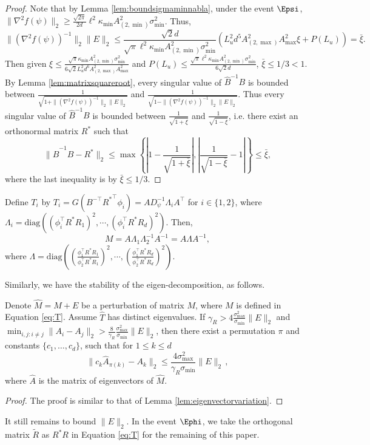 \begin{proof}
Note that by Lemma \ref{lem:boundsigmaminnabla},  under the event $\Epsi$, $\|\nabla^2f(\psi)\|_2 \ge \frac{\sqrt{2\pi}}{2d}\ell^2\kappa_{\min}A^2_{(2,\min)}\sigma_{\min}^2$. Thus,
\[
\|\left(\nabla^2f(\psi)\right)^{-1}\|_2 \|E\|_2 \le \frac{\sqrt{2}d}{\sqrt{\pi}\ell^2\kappa_{\min}A^2_{(2,\min)}\sigma_{\min}^2}\left(L_u^2d^5 A_{(2,\max)}^2A_{\max}^2\xi + P(L_u)\right) = \bar{\xi}.
\]
Then given $\xi \le \frac{\sqrt{\pi}\kappa_{\min}A^2_{(2,\min)}\sigma_{\min}^2}{6\sqrt{2}L_u^2d^6A_{(2,\max)}^2A_{\max}^2}$
and 
$P(L_u) \le \frac{\sqrt{\pi}\ell^2\kappa_{\min}A^2_{(2,\min)}\sigma_{\min}^2}{6\sqrt{2}d}$, $\bar{\xi} \le 1/3 < 1$. 
By Lemma \ref{lem:matrixsquareroot}, every singular value of $\hat{B}^{-1}B$ is bounded between $\frac{1}{\sqrt{1 + \|\left(\nabla^2f(\psi)\right)^{-1}\|_2 \|E\|_2}}$ and $\frac{1}{\sqrt{1 - \|\left(\nabla^2f(\psi)\right)^{-1}\|_2 \|E\|_2}}$. 
Thus every singular value of $\hat{B}^{-1}B$ is bounded between $\frac{1}{\sqrt{1+\bar{\xi}}}$ and $\frac{1}{\sqrt{1-\bar{\xi}}}$, i.e. there exist an orthonormal matrix $R^*$ such that 
\[
\|\hat{B}^{-1}B - R^*\|_2 \le \max \left\{ \left|1-\frac{1}{\sqrt{1+\bar{\xi}}}\right| , \left|\frac{1}{\sqrt{1-\bar{\xi}}}-1\right| \right\} \le \bar{\xi},
\]
where the last inequality is by $\bar{\xi} \le 1/3$.
\end{proof}

Define $T_i$ by $T_i = G(B^{-\top}{R^*}^{\top}\phi_i) = A D_{\psi}^{-1}\Lambda_iA^{\top}$ for $i \in \{1,2\}$,
where $\Lambda_i = \text{diag}\left((\phi_i^{\top}R^*R_1)^2, \cdots, (\phi_i^{\top}R^*R_d)^2\right)$. 
Then, 
\begin{equation}
\label{eq:T}
M = A \Lambda_1 \Lambda_2^{-1} A^{-1} = A \Lambda A^{-1},
\end{equation}
where $\Lambda = \text{diag}\left((\frac{\phi_1^{\top}R^*R_1}{\phi_2^{\top}R^*R_1})^2, \cdots, (\frac{\phi_1^{\top}R^*R_d}{\phi_2^{\top}R^*R_d})^2\right)$. 

Similarly, we have the stability of the eigen-decomposition, as follows. 
\begin{lemma}
\label{lem:Teigenvectorvariation}
Denote $\hat{M} = M+E$ be a perturbation of matrix $M$, where $M$ is defined in Equation \eqref{eq:T}. 
Assume $\hat{T}$ has distinct eigenvalues. 
If $\gamma_R > 4 \frac{\sigma_{\max}^2}{\sigma_{\min} }\|E\|_2$ and $\min_{i,j:i\neq j} \|A_i - A_j\|_2 > \frac{8}{\gamma_R}\frac{\sigma_{\max}^2}{\sigma_{\min} } \|E\|_2$, then there exist a permutation $\pi$ and constants $\{c_1,\ldots,c_d\}$, such that for $1\le k\le d$
\[
\| c_k\hat{A}_{\pi(k)} - A_k\|_2 \le \frac{4\sigma^2_{\max}}{\gamma_R\sigma_{\min}} \|E\|_2\,,
\]
where $\hat{A}$ is the matrix of eigenvectors of $\hat{M}$. 
\end{lemma}
\begin{proof}
The proof is similar to that of Lemma \ref{lem:eigenvectorvariation}.
\end{proof}
It still remains to bound $\|E\|_2$. In the event $\Ephi$, we take the orthogonal matrix $\tilde{R}$ as $R^*R$ in Equation \ref{eq:T} for the remaining of this paper.

